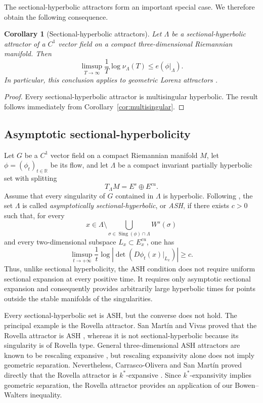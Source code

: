 \documentclass[11pt,reqno]{amsart}
\newtheorem{corollary}[theorem]{Corollary}
\theoremstyle{definition}
\theoremstyle{remark}
\newcommand{\Sing}{\operatorname{Sing}}
\begin{document}
The sectional-hyperbolic attractors \cite{mm} form an important
special case. We therefore obtain the following consequence.

\begin{corollary}[Sectional-hyperbolic attractors]
\label{cor:singular-hyperbolic}
Let $\Lambda$ be a sectional-hyperbolic attractor of a $C^1$ vector
field on a compact three-dimensional Riemannian manifold. Then
\[
\limsup_{T\to\infty}
\frac{1}{T}\log\nu_\Lambda(T)
\leq e(\phi|_\Lambda).
\]
In particular, this conclusion applies to geometric Lorenz
attractors \cite{gw}.
\end{corollary}

\begin{proof}
Every sectional-hyperbolic attractor is
multisingular hyperbolic. The result follows immediately from
Corollary~\ref{cor:multisingular}.
\end{proof}




\subsection{Asymptotic sectional-hyperbolicity}
Let $G$ be a $C^1$ vector field on a compact Riemannian manifold $M$,
let $\phi=(\phi_t)_{t\in\mathbb R}$ be its flow, and let $\Lambda$ be
a compact invariant partially hyperbolic set with splitting
\[
T_\Lambda M=E^s\oplus E^{cu}.
\]
Assume that every singularity of $G$ contained in $\Lambda$ is
hyperbolic. Following \cite{ms}, the set $\Lambda$
is called \emph{asymptotically sectional-hyperbolic}, or \emph{ASH},
if there exists $c>0$ such that, for every
\[
x\in
\Lambda\setminus
\bigcup_{\sigma\in\Sing(\phi)\cap\Lambda}W^s(\sigma)
\]
and every two-dimensional subspace $L_x\subset E^{cu}_x$, one has
\[
\limsup_{t\to+\infty}
\frac{1}{t}
\log
\left|
\det\left(D\phi_t(x)|_{L_x}\right)
\right|
\geq c.
\]
Thus, unlike sectional hyperbolicity, the ASH condition does not
require uniform sectional expansion at every positive time. It
requires only asymptotic sectional expansion and consequently provides
arbitrarily large hyperbolic times for points outside the stable
manifolds of the singularities.

Every sectional-hyperbolic set is ASH, but the converse does not hold.
The principal example is the Rovella attractor. San Mart\'{i}n and Vivas \cite{sv}
proved that the Rovella attractor is ASH \cite{sv1}, whereas it
is not sectional-hyperbolic because its singularity is of Rovella
type. General three-dimensional ASH attractors are known to be
rescaling expansive \cite{rv}, but rescaling expansivity alone does not imply
geometric separation. Nevertheless, Carrasco-Olivera and San Martín
proved directly that the Rovella attractor \cite{k} is $k^*$-expansive
\cite{csm}. Since $k^*$-expansivity implies geometric separation, the
Rovella attractor provides an application of our Bowen--Walters
inequality.
\end{document}
